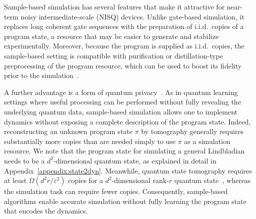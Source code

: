 \documentclass[superscriptaddress,amsmath,amssymb,aps,pra,letterpaper,tightenlines,notitlepages,12pt]{revtex4-2}
\begin{document}
Sample-based simulation has several features that make it attractive for near-term noisy intermediate-scale (NISQ) devices. Unlike gate-based simulation, it replaces long coherent gate sequences with the preparation of i.i.d.~copies of a program state, a resource that may be easier to generate and stabilize experimentally. Moreover, because the program is supplied as i.i.d.~copies, the sample-based setting is compatible with purification or distillation-type preprocessing of the program resource, which can be used to boost its fidelity prior to the simulation~\cite{bennett1996MixedStateEntanglement, bravyi2005UniversalQuantumComputation, yuan2023VirtualQuantumResource}.

A further advantage is a form of quantum privacy~\cite{aaronson2009QuantumCopyProtectionQuantum, kimmel2017HamiltonianSimulationOptimal, patel2023WaveMatrixLindbladization}. As in quantum learning settings where useful processing can be performed without fully revealing the underlying quantum data, sample-based simulation allows one to implement dynamics without exposing a complete description of the program state. Indeed, reconstructing an unknown program state $\pi$ by tomography generally requires substantially more copies than are needed simply to use $\pi$ as a simulation resource. We note that the program state for simulating a general Lindbladian needs to be a $d^2$-dimensional quantum state, as explained in detail in Appendix~\ref{appendix:state2dyn}. Meanwhile, quantum state tomography requires at least ${\Omega}(d^{2}r/\varepsilon^2)$ copies for a $d^2$-dimensional rank-$r$ quantum state~\cite{haah2016SampleoptimalTomographyQuantum, haah2017SampleoptimalTomographyQuantum, yuen2023ImprovedSampleComplexity, patel2023WaveMatrixLindbladizationa,  anshu2023SurveyComplexityLearning}, whereas the simulation task can require fewer copies. Consequently, sample-based algorithms enable accurate simulation without fully learning the program state that encodes the dynamics.
\end{document}
